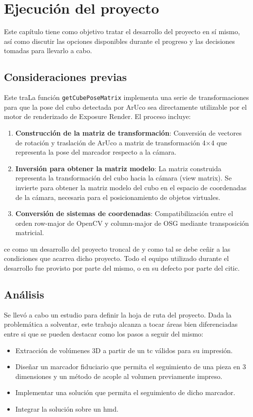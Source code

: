 \chapter{Ejecución del proyecto}
\label{chap:edp}
Este capítulo tiene como objetivo tratar el desarrollo del proyecto en sí mismo, así como discutir las opciones disponibles durante el progreso y las decisiones tomadas para llevarlo a cabo.

\section{Consideraciones previas}
Este traLa función \texttt{getCubePoseMatrix} implementa una serie de transformaciones para que la pose del cubo detectada por ArUco sea directamente utilizable por el motor de renderizado de Exposure Render. El proceso incluye:

\begin{enumerate}
    \item \textbf{Construcción de la matriz de transformación}: Conversión de vectores de rotación y traslación de ArUco a matriz de transformación 4×4 que representa la pose del marcador respecto a la cámara.
    \item \textbf{Inversión para obtener la matriz modelo}: La matriz construida representa la transformación del cubo hacia la cámara (view matrix). Se invierte para obtener la matriz modelo del cubo en el espacio de coordenadas de la cámara, necesaria para el posicionamiento de objetos virtuales.
    \item \textbf{Conversión de sistemas de coordenadas}: Compatibilización entre el orden row-major de OpenCV y column-major de OSG mediante transposición matricial.
\end{enumerate}ce como un desarrollo del proyecto troncal de \citeauthor{IglesiasGuitian2022} y como tal se debe ceñir a las condiciones que acarrea dicho proyecto. Todo el equipo utilizado durante el desarrollo fue provisto por parte del mismo, o en su defecto por parte del \acrfull{citic}.

\section{Análisis}
Se llevó a cabo un estudio para definir la hoja de ruta del proyecto. Dada la problemática a solventar, este trabajo alcanza a tocar áreas bien diferenciadas entre si que se pueden destacar como los pasos a seguir del mismo:
\begin{itemize}
	\item Extracción de volúmenes 3D a partir de un \acrshort{tc} válidos para su impresión.
	\item Diseñar un marcador fiduciario que permita el seguimiento de una pieza en 3 dimensiones y un método de acople al volumen previamente impreso.
	\item Implementar una solución que permita el seguimiento de dicho marcador.
	\item Integrar la solución sobre un \acrshort{hmd}.
\end{itemize}

